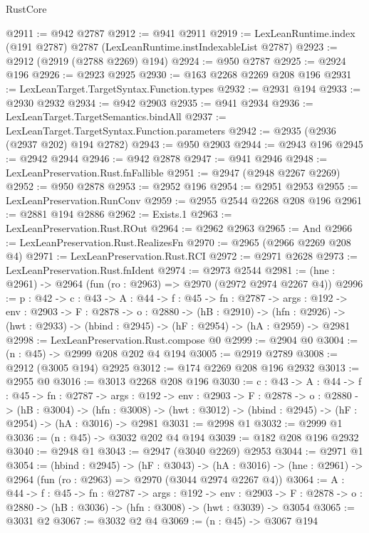 \begin{lexlean}{RustCore}
\begin{coremodule}
@2911 := @942 @2787
@2912 := @941 @2911
@2919 := LexLeanRuntime.index (@191 @2787) @2787 (LexLeanRuntime.instIndexableList @2787)
@2923 := @2912 (@2919 (@2788 @2269) @194)
@2924 := @950 @2787
@2925 := @2924 @196
@2926 := @2923 @2925
@2930 := @163 @2268 @2269 @208 @196
@2931 := LexLeanTarget.TargetSyntax.Function.types
@2932 := @2931 @194
@2933 := @2930 @2932
@2934 := @942 @2903
@2935 := @941 @2934
@2936 := LexLeanTarget.TargetSemantics.bindAll
@2937 := LexLeanTarget.TargetSyntax.Function.parameters
@2942 := @2935 (@2936 (@2937 @202) @194 @2782)
@2943 := @950 @2903
@2944 := @2943 @196
@2945 := @2942 @2944
@2946 := @942 @2878
@2947 := @941 @2946
@2948 := LexLeanPreservation.Rust.fnFallible
@2951 := @2947 (@2948 @2267 @2269)
@2952 := @950 @2878
@2953 := @2952 @196
@2954 := @2951 @2953
@2955 := LexLeanPreservation.RunConv
@2959 := @2955 @2544 @2268 @208 @196
@2961 := @2881 @194 @2886
@2962 := Exists.{1}
@2963 := LexLeanPreservation.Rust.ROut
@2964 := @2962 @2963
@2965 := And
@2966 := LexLeanPreservation.Rust.RealizesFn
@2970 := @2965 (@2966 @2269 @208 @4)
@2971 := LexLeanPreservation.Rust.RCI
@2972 := @2971 @2628
@2973 := LexLeanPreservation.Rust.fnIdent
@2974 := @2973 @2544
@2981 := (hne : @2961) -> @2964 (fun (ro : @2963) => @2970 (@2972 @2974 @2267 @4))
@2996 := {p : @42} ->
  {c : @43} ->
  {A : @44} ->
  {f : @45} ->
  {fn : @2787} ->
  {args : @192} ->
  {env : @2903} ->
  {F : @2878} ->
  {o : @2880} ->
  (hB : @2910) ->
  (hfn : @2926) -> (hwt : @2933) -> (hbind : @2945) -> (hF : @2954) -> (hA : @2959) -> @2981
@2998 := LexLeanPreservation.Rust.compose @0
@2999 := @2904 @0
@3004 := (n : @45) -> @2999 @208 @202 @4 @194
@3005 := @2919 @2789
@3008 := @2912 (@3005 @194) @2925
@3012 := @174 @2269 @208 @196 @2932
@3013 := @2955 @0
@3016 := @3013 @2268 @208 @196
@3030 := {c : @43} ->
  {A : @44} ->
  {f : @45} ->
  {fn : @2787} ->
  {args : @192} ->
  {env : @2903} ->
  {F : @2878} ->
  {o : @2880} ->
  (hB : @3004) ->
  (hfn : @3008) -> (hwt : @3012) -> (hbind : @2945) -> (hF : @2954) -> (hA : @3016) -> @2981
@3031 := @2998 @1
@3032 := @2999 @1
@3036 := (n : @45) -> @3032 @202 @4 @194
@3039 := @182 @208 @196 @2932
@3040 := @2948 @1
@3043 := @2947 (@3040 @2269) @2953
@3044 := @2971 @1
@3054 := (hbind : @2945) ->
  (hF : @3043) ->
  (hA : @3016) -> (hne : @2961) -> @2964 (fun (ro : @2963) => @2970 (@3044 @2974 @2267 @4))
@3064 := {A : @44} ->
  {f : @45} ->
  {fn : @2787} ->
  {args : @192} ->
  {env : @2903} ->
  {F : @2878} -> {o : @2880} -> (hB : @3036) -> (hfn : @3008) -> (hwt : @3039) -> @3054
@3065 := @3031 @2
@3067 := @3032 @2 @4
@3069 := (n : @45) -> @3067 @194

\end{coremodule}
\end{lexlean}
